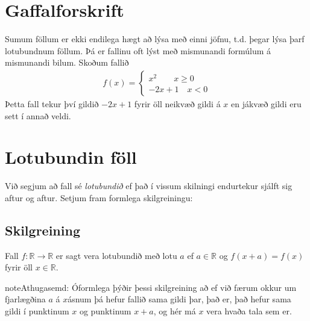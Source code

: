 \documentclass[a4paper,10pt,icelandic]{sphinxmanual}
\begin{document}
\section{Gaffalforskrift}
\label{\detokenize{Kafli05:gaffalforskrift}}
Sumum föllum er ekki endilega hægt að lýsa með einni jöfnu, t.d. þegar lýsa þarf lotubundnum föllum. Þá er fallinu oft lýst með mismunandi formúlum á mismunandi bilum. Skoðum fallið
\begin{equation*}
\begin{split}f(x) =
\begin{cases}
x^2 \qquad x \geq 0\\
-2x+1 \quad x < 0
\end{cases}\end{split}
\end{equation*}
Þetta fall tekur því gildið \(-2x+1\) fyrir öll neikvæð gildi á \(x\) en jákvæð gildi eru sett í annað veldi.

\begin{figure}[htbp]
\centering

\noindent{}
\end{figure}


\section{Lotubundin föll}
\label{\detokenize{Kafli05:lotubundin-foll}}
Við segjum að fall sé \textit{lotubundið} ef það í vissum skilningi endurtekur sjálft sig aftur og aftur. Setjum fram formlega skilgreiningu:


\subsection{Skilgreining}
\label{\detokenize{Kafli05:id2}}
Fall \(f: \mathbb{R} \to \mathbb{R}\) er sagt vera lotubundið með lotu \(a\) ef \(a \in \mathbb{R}\) og \(f(x+a)=f(x)\) fyrir öll \(x \in \mathbb{R}\).

\begin{sphinxadmonition}{note}{Athugasemd:}
Óformlega þýðir þessi skilgreining að ef við færum okkur um fjarlægðina \(a\) á \(x\)\sphinxhyphen{}ásnum þá hefur fallið sama gildi þar, það er, það hefur sama gildi í punktinum \(x\) og punktinum \(x+a\), og hér má \(x\) vera hvaða tala sem er.
\end{sphinxadmonition}
\end{document}
